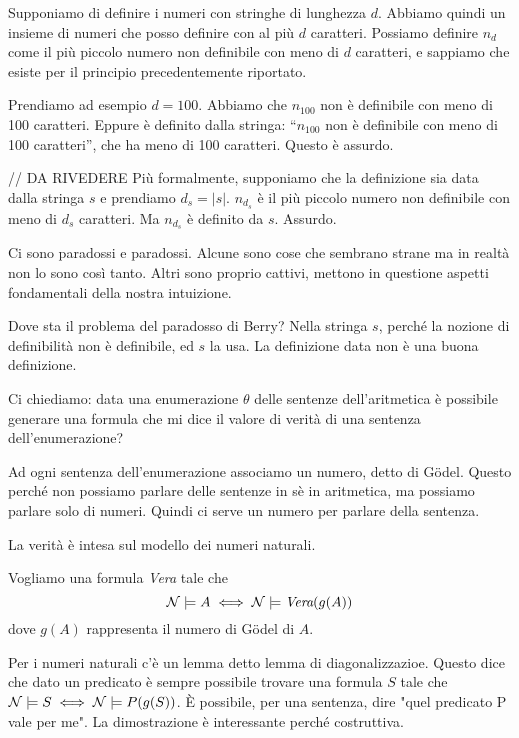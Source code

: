 Supponiamo di definire i numeri con stringhe di lunghezza $d$. Abbiamo quindi un insieme di numeri
che posso definire con al più $d$ caratteri. Possiamo definire $n_d$ come il più piccolo numero
non definibile con meno di $d$ caratteri, e sappiamo che esiste per il principio precedentemente
riportato.

Prendiamo ad esempio $d=100$. Abbiamo che $n_{100}$ non è definibile con meno di 100 caratteri. Eppure
è definito dalla stringa: ``$n_{100}$ non è definibile con meno di 100 caratteri'', che ha meno di 100
caratteri. Questo è assurdo.

// DA RIVEDERE
Più formalmente, supponiamo che la definizione sia data dalla stringa $s$ e prendiamo $d_{s} = |s|$.
$n_{d_{s}}$ è il più piccolo numero non definibile con meno di $d_{s}$ caratteri. Ma $n_{d_{s}}$ è
definito da $s$. Assurdo.

Ci sono paradossi e paradossi. Alcune sono cose che sembrano strane ma in realtà non lo sono così
tanto. Altri sono proprio cattivi, mettono in questione aspetti fondamentali della nostra
intuizione.

Dove sta il problema del paradosso di Berry? Nella stringa $s$, perché la nozione di definibilità non
è definibile, ed $s$ la usa. La definizione data non è una buona definizione.

Ci chiediamo: data una enumerazione $\theta$ delle sentenze dell'aritmetica è possibile generare una
formula che mi dice il valore di verità di una sentenza dell'enumerazione?

Ad ogni sentenza dell'enumerazione associamo un numero, detto di Gödel. Questo perché non possiamo
parlare delle sentenze in sè in aritmetica, ma possiamo parlare solo di numeri. Quindi ci serve un
numero per parlare della sentenza.

La verità è intesa sul modello dei numeri naturali.

Vogliamo una formula \textit{Vera} tale che
\begin{equation*}
    \mathcal{N} \models A \iff \mathcal{N} \models \textit{Vera}(g(A))
\end{equation*}
dove $g(A)$ rappresenta il numero di Gödel di $A$.

Per i numeri naturali c'è un lemma detto lemma di diagonalizzazioe. Questo dice che dato un
predicato è sempre possibile trovare una formula $S$ tale che $\mathcal{N} \models S \iff \mathcal{N} \models
P(g(S))$. È possibile, per una sentenza, dire "quel predicato P vale per me". La dimostrazione è
interessante perché costruttiva.

